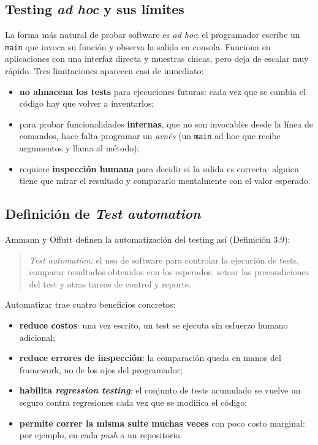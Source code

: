 \documentclass[12pt,a4paper]{article}
\begin{document}
\subsection{Testing \textit{ad hoc} y sus límites}
La forma más natural de probar software es \textit{ad hoc}: el programador escribe un \texttt{main} que invoca su función y observa la salida en consola. Funciona en aplicaciones con una interfaz directa y muestras chicas, pero deja de escalar muy rápido. Tres limitaciones aparecen casi de inmediato:
\begin{itemize}
  \item \textbf{no almacena los tests} para ejecuciones futuras: cada vez que se cambia el código hay que volver a inventarlos;
  \item para probar funcionalidades \textbf{internas}, que no son invocables desde la línea de comandos, hace falta programar un \textit{arnés} (un \texttt{main} ad hoc que recibe argumentos y llama al método);
  \item requiere \textbf{inspección humana} para decidir si la salida es correcta: alguien tiene que mirar el resultado y compararlo mentalmente con el valor esperado.
\end{itemize}

\subsection{Definición de \textit{Test automation}}
Ammann y Offutt definen la automatización del testing así (Definición 3.9):
\begin{quote}
\textit{Test automation:} el uso de software para controlar la ejecución de tests, comparar resultados obtenidos con los esperados, setear las precondiciones del test y otras tareas de control y reporte.
\end{quote}
Automatizar trae cuatro beneficios concretos:
\begin{itemize}
  \item \textbf{reduce costos}: una vez escrito, un test se ejecuta sin esfuerzo humano adicional;
  \item \textbf{reduce errores de inspección}: la comparación queda en manos del framework, no de los ojos del programador;
  \item \textbf{habilita \textit{regression testing}}: el conjunto de tests acumulado se vuelve un seguro contra regresiones cada vez que se modifica el código;
  \item \textbf{permite correr la misma suite muchas veces} con poco costo marginal: por ejemplo, en cada \textit{push} a un repositorio.
\end{itemize}
\end{document}
